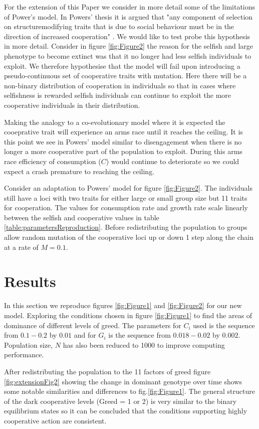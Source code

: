 \documentclass[a4paper,10pt, twocolumn]{article}
\begin{document}
For the extension of this Paper we consider in more detail some of the limitations of Power's model. In Powers' thesis it is argued that "any component of selection on structuremodifying traits that is due to social behaviour must be in the direction of increased cooperation" \cite{Thesis}. We would like to test probe this hypothesis in more detail. Consider in figure \ref{fig:Figure2} the reason for the selfish and large phenotype to become extinct was that it no longer had less selfish individuals to exploit. We therefore hypothesise that the model will fail upon introducing a pseudo-continuous set of cooperative traits with mutation. Here there will be a non-binary distribution of cooperation in individuals so that in cases where selfishness is rewarded selfish individuals can continue to exploit the more cooperative individuals in their distribution. 

Making the analogy to a co-evolutionary model where it is expected the cooeprative trait will experience an arms race until it reaches the ceiling. It is this point we see in Powers' model similar to disengagement when there is no longer a more cooperative part of the population to exploit. During this arms race efficiency of consumption ($C$) would continue to deteriorate so we could expect a crash premature to reaching the ceiling. 

Consider an adaptation to Powers' model for figure \ref{fig:Figure2}. The individuals still have a loci with two traits for either large or small group size but 11 traits for cooperation. The values for consumption rate and growth rate scale linearly between the selfish and cooperative values in table \ref{table:parametersReproduction}. Before redistributing the population to groups allow random mutation of the cooperative loci up or down 1 step along the chain at a rate of $M = 0.1$.


\section{Results}
In this section we reproduce figures \ref{fig:Figure1} and \ref{fig:Figure2} for our new model. Exploring the conditions chosen in figure \ref{fig:Figure1} to find the areas of dominance of different levels of greed. The parameters for $C_i$ used is the sequence from $0.1 - 0.2$ by $0.01$ and for $G_i$ is the sequence from $0.018 - 0.02$ by $0.002$. Population size, $N$ has also been reduced to 1000 to improve computing performance. 

After redistributing the population to the 11 factors of greed figure \ref{fig:extensionFig2} showing the change in dominant genotype over time shows some notable similarities and differences to fig.\ref{fig:Figure1}. The general structure of the dark cooperative levels (Greed = 1 or 2) is very similar to the binary equilibrium states so it can be concluded that the conditions supporting highly cooperative action are consistent. 
\end{document}
